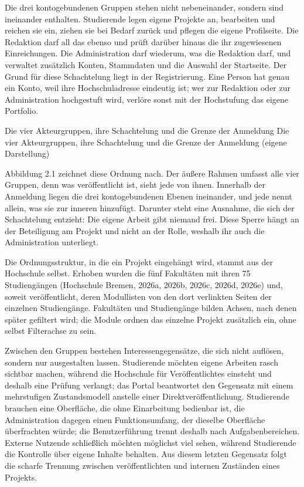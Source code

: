 Die drei kontogebundenen Gruppen stehen nicht nebeneinander, sondern sind ineinander enthalten. Studierende legen eigene Projekte an, bearbeiten und reichen sie ein, ziehen sie bei Bedarf zurück und pflegen die eigene Profilseite. Die Redaktion darf all das ebenso und prüft darüber hinaus die ihr zugewiesenen Einreichungen. Die Administration darf wiederum, was die Redaktion darf, und verwaltet zusätzlich Konten, Stammdaten und die Auswahl der Startseite. Der Grund für diese Schachtelung liegt in der Registrierung. Eine Person hat genau ein Konto, weil ihre Hochschuladresse eindeutig ist; wer zur Redaktion oder zur Administration hochgestuft wird, verlöre sonst mit der Hochstufung das eigene Portfolio.

%
{Die vier Akteurgruppen, ihre Schachtelung und die Grenze der Anmeldung}%
{Die vier Akteurgruppen, ihre Schachtelung und die Grenze der Anmeldung (eigene Darstellung)}

Abbildung 2.1 zeichnet diese Ordnung nach. Der äußere Rahmen umfasst alle vier Gruppen, denn was veröffentlicht ist, sieht jede von ihnen. Innerhalb der Anmeldung liegen die drei kontogebundenen Ebenen ineinander, und jede nennt allein, was sie zur inneren hinzufügt. Darunter steht eine Ausnahme, die sich der Schachtelung entzieht: Die eigene Arbeit gibt niemand frei. Diese Sperre hängt an der Beteiligung am Projekt und nicht an der Rolle, weshalb ihr auch die Administration unterliegt.

Die Ordnungsstruktur, in die ein Projekt eingehängt wird, stammt aus der Hochschule selbst. Erhoben wurden die fünf Fakultäten mit ihren 75 Studiengängen (Hochschule Bremen, 2026a, 2026b, 2026c, 2026d, 2026e) und, soweit veröffentlicht, deren Modullisten von den dort verlinkten Seiten der einzelnen Studiengänge. Fakultäten und Studiengänge bilden Achsen, nach denen später gefiltert wird; die Module ordnen das einzelne Projekt zusätzlich ein, ohne selbst Filterachse zu sein.

Zwischen den Gruppen bestehen Interessengegensätze, die sich nicht auflösen, sondern nur ausgestalten lassen. Studierende möchten eigene Arbeiten rasch sichtbar machen, während die Hochschule für Veröffentlichtes einsteht und deshalb eine Prüfung verlangt; das Portal beantwortet den Gegensatz mit einem mehrstufigen Zustandsmodell anstelle einer Direktveröffentlichung. Studierende brauchen eine Oberfläche, die ohne Einarbeitung bedienbar ist, die Administration dagegen einen Funktionsumfang, der dieselbe Oberfläche überfrachten würde; die Benutzerführung trennt deshalb nach Aufgabenbereichen. Externe Nutzende schließlich möchten möglichst viel sehen, während Studierende die Kontrolle über eigene Inhalte behalten. Aus diesem letzten Gegensatz folgt die scharfe Trennung zwischen veröffentlichten und internen Zuständen eines Projekts.

